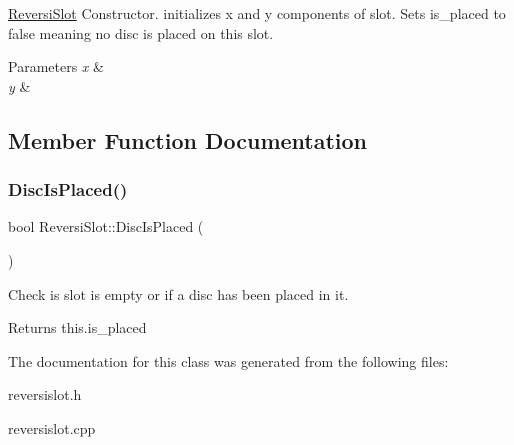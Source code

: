 \hyperlink{classReversiSlot}{Reversi\+Slot} Constructor. initializes x and y components of slot. Sets is\+\_\+placed to false meaning no disc is placed on this slot. 


\begin{DoxyParams}{Parameters}
{\em x} & \\
\hline
{\em y} & \\
\hline
\end{DoxyParams}


\subsection{Member Function Documentation}
\mbox{\label{classReversiSlot_a7816512c180521bc7d9f91bb4d87e7e1}} 
\subsubsection{\texorpdfstring{Disc\+Is\+Placed()}{DiscIsPlaced()}}
{\footnotesize\ttfamily bool Reversi\+Slot\+::\+Disc\+Is\+Placed (\begin{DoxyParamCaption}{ }\end{DoxyParamCaption})}



Check is slot is empty or if a disc has been placed in it. 

\begin{DoxyReturn}{Returns}
this.\+is\+\_\+placed 
\end{DoxyReturn}


The documentation for this class was generated from the following files\+:\begin{DoxyCompactItemize}
\item 
reversislot.\+h\item 
reversislot.\+cpp\end{DoxyCompactItemize}
